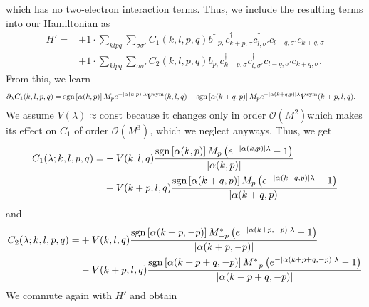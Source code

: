 which has no two-electron interaction terms. Thus, we include the resulting terms into our Hamiltonian as 
\begin{align*}
	H'= 	&+1 \cdot \sum_{ k l p q } \sum_{ \sigma \sigma' } C_1( k, l, p, q )   b_{ -p, }^\dagger  c_{ k+p, \sigma }^\dagger  c_{ l, \sigma' }^\dagger  c_{ l-q, \sigma' } c_{ k+q, \sigma }  \\
	&+1 \cdot \sum_{ k l p q } \sum_{ \sigma \sigma' } C_2( k, l, p, q )   b_{ p, } c_{ k+p, \sigma }^\dagger  c_{ l, \sigma' }^\dagger  c_{ l-q, \sigma' } c_{ k+q, \sigma } 
. \end{align*}
From this, we learn \begin{align*}
	\partial_\lambda C_1(k,l,p,q) &= \operatorname{sgn} \left[\alpha (k, p)\right] M_{p} e^{ - | \alpha (k,p) | \lambda } V^\mathrm{sym}( k, l, q )  - \operatorname{sgn} \left[\alpha (k+q, p)\right] M_{p} e^{ - | \alpha (k+q,p) | \lambda } V^\mathrm{sym}( k+p, l, q ) . \end{align*}
We assume $V(\lambda) \approx \mathrm{const}$ because it changes only in order $\mathcal{O}(M^2)$which makes its effect on $C_1$ of order $\mathcal{O}(M^3)$, which we neglect anyways. Thus, we get \begin{align*}
	C_1(\lambda; k, l, p, q) =&- V(k, l, q) \frac{\operatorname{sgn} \left[\alpha (k, p)\right] M_{p} \left(  e^{ - | \alpha (k,p) | \lambda } - 1 \right)}{|\alpha (k, p)|}\\
		& + V(k+p, l, q) \frac{\operatorname{sgn} \left[\alpha (k+q, p)\right] M_{p} \left(  e^{ - | \alpha (k+q,p) | \lambda } - 1 \right)}{|\alpha (k+q, p)|}\end{align*}
and
\begin{align*}
	C_2(\lambda; k, l, p, q) =&+ V(k, l, q) \frac{\operatorname{sgn} \left[ \alpha (k+p, -p) \right] M_{-p}^* \left(  e^{ - | \alpha (k+p,-p) | \lambda } - 1 \right)}{|\alpha (k+p, -p)|}\\
		& - V(k+p, l, q) \frac{\operatorname{sgn} \left[ \alpha (k+p+q, -p) \right] M_{-p}^* \left(  e^{ - | \alpha (k+p+q,-p) | \lambda } - 1 \right)}{|\alpha (k+p+q, -p)|}\end{align*}
We commute again with $H'$ and obtain
